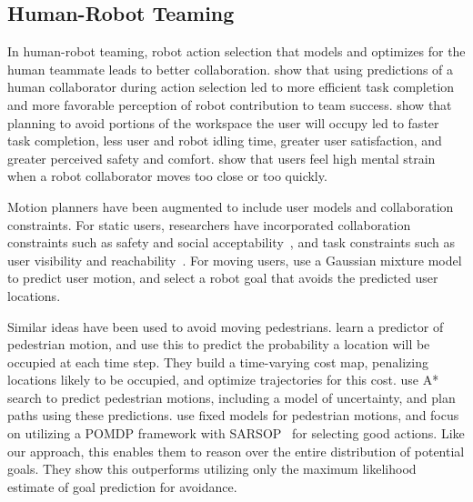 \subsection{Human-Robot Teaming}
\label{sec:related_collaboration}



In human-robot teaming, robot action selection that models and optimizes for the human teammate leads to better collaboration. \citet{hoffman_2007} show that using predictions of a human collaborator during action selection led to more efficient task completion and more favorable perception of robot contribution to team success. \citet{lasota_2015} show that planning to avoid portions of the workspace the user will occupy led to faster task completion, less user and robot idling time, greater user satisfaction, and greater perceived safety and comfort. \citet{arai_2010} show that users feel high mental strain when a robot collaborator moves too close or too quickly.

Motion planners have been augmented to include user models and collaboration constraints. For static users, researchers have incorporated collaboration constraints such as safety and social acceptability~\citep{sisbot_2007}, and task constraints such as user visibility and reachability~\citep{sisbot_2010, pandey_2010, mainprice_2011}. For moving users, \citet{mainprice_2013} use a Gaussian mixture model to predict user motion, and select a robot goal that avoids the predicted user locations.




Similar ideas have been used to avoid moving pedestrians. \citet{ziebart_2009} learn a predictor of pedestrian motion, and use this to predict the probability a location will be occupied at each time step. They build a time-varying cost map, penalizing locations likely to be occupied, and optimize trajectories for this cost. \citet{chung_2011} use A* search to predict pedestrian motions, including a model of uncertainty, and plan paths using these predictions. \citet{bandy_2012} use fixed models for pedestrian motions, and focus on utilizing a POMDP framework with SARSOP~\citep{kurniawati_2008} for selecting good actions. Like our approach, this enables them to reason over the entire distribution of potential goals. They show this outperforms utilizing only the maximum likelihood estimate of goal prediction for avoidance. 

